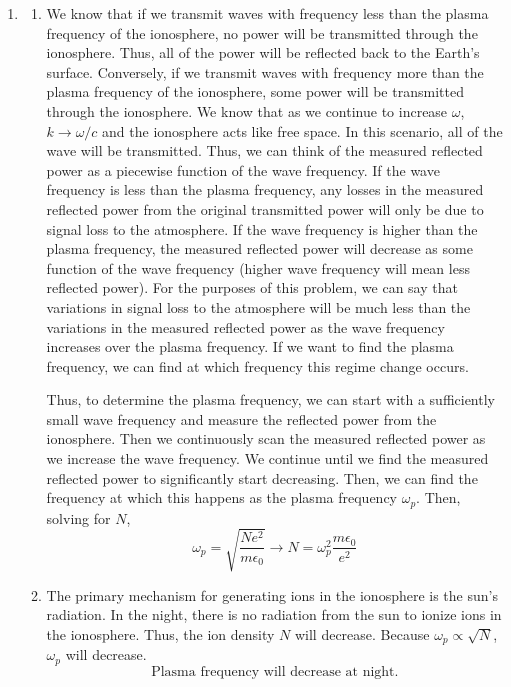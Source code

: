 \documentclass[12pt]{article}
\begin{document}
\begin{enumerate}
\begin{enumerate}
		\item [Pt 2.]
		\begin{enumerate}
			\item [a.]
			We know that if we transmit waves with frequency less than the plasma frequency of the ionosphere, no power will be transmitted through the ionosphere.
			Thus, all of the power will be reflected back to the Earth's surface.
			Conversely, if we transmit waves with frequency more than the plasma frequency of the ionosphere, some power will be transmitted through the ionosphere.
			We know that as we continue to increase $\omega$, $k\to\omega/c$ and the ionosphere acts like free space.
			In this scenario, all of the wave will be transmitted.
			Thus, we can think of the measured reflected power as a piecewise function of the wave frequency.
			If the wave frequency is less than the plasma frequency, any losses in the measured reflected power from the original transmitted power will only be due to signal loss to the atmosphere.
			If the wave frequency is higher than the plasma frequency, the measured reflected power will decrease as some function of the wave frequency (higher wave frequency will mean less reflected power).
			For the purposes of this problem, we can say that variations in signal loss to the atmosphere will be much less than the variations in the measured reflected power as the wave frequency increases over the plasma frequency.
			If we want to find the plasma frequency, we can find at which frequency this regime change occurs.
			
			Thus, to determine the plasma frequency, we can start with a sufficiently small wave frequency and measure the reflected power from the ionosphere.
			Then we continuously scan the measured reflected power as we increase the wave frequency.
			We continue until we find the measured reflected power to significantly start decreasing.
			Then, we can find the frequency at which this happens as the plasma frequency $\omega_p$.
			Then, solving for $N$,
			\[\omega_p=\sqrt{\frac{Ne^2}{m\epsilon_0}}\to N = \omega_p^2\frac{m\epsilon_0}{e^2}\]

			\item [b.]
			The primary mechanism for generating ions in the ionosphere is the sun's radiation.
			In the night, there is no radiation from the sun to ionize ions in the ionosphere.
			Thus, the ion density $N$ will decrease.
			Because $\omega_p \propto \sqrt{N}$, $\omega_p$ will decrease.
			\[\boxed{\text{Plasma frequency will decrease at night.}}\]
			

\end{enumerate}
\end{enumerate}
\end{enumerate}
\end{document}
